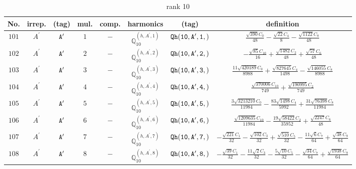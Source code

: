 \documentclass[fleqn,8pt]{jsarticle}
\begin{document}
\begin{table}[ht!]
\begin{center}
\caption{rank 10}
\renewcommand{\arraystretch}{1.3}
\begin{tabular}{cccccccc} \hline \hline
No. & irrep. & (tag) & mul. & comp. & harmonics & (tag) & definition \\ \hline
$ 101 $ & $ A^{\prime} $ & $ {\tt A'} $ & $ 1 $ & $ - $ & $ \mathbb{Q}_{10}^{(h,A^{\prime},1)} $ & $ {\tt Qh(10,A',1,)} $ & $ \frac{\sqrt{390} C_{0}}{48} - \frac{\sqrt{22} C_{4}}{8} - \frac{\sqrt{1122} C_{8}}{48} $ \\
$ 102 $ & $ A^{\prime} $ & $ {\tt A'} $ & $ 2 $ & $ - $ & $ \mathbb{Q}_{10}^{(h,A^{\prime},2)} $ & $ {\tt Qh(10,A',2,)} $ & $ - \frac{\sqrt{85} C_{10}}{16} + \frac{\sqrt{1482} C_{2}}{48} + \frac{\sqrt{57} C_{6}}{48} $ \\
$ 103 $ & $ A^{\prime} $ & $ {\tt A'} $ & $ 3 $ & $ - $ & $ \mathbb{Q}_{10}^{(h,A^{\prime},3)} $ & $ {\tt Qh(10,A',3,)} $ & $ \frac{11 \sqrt{420189} C_{0}}{8988} + \frac{\sqrt{827645} C_{4}}{1498} - \frac{\sqrt{146055} C_{8}}{8988} $ \\
$ 104 $ & $ A^{\prime} $ & $ {\tt A'} $ & $ 4 $ & $ - $ & $ \mathbb{Q}_{10}^{(h,A^{\prime},4)} $ & $ {\tt Qh(10,A',4,)} $ & $ \frac{\sqrt{370006} C_{10}}{749} + \frac{\sqrt{190995} C_{2}}{749} $ \\
$ 105 $ & $ A^{\prime} $ & $ {\tt A'} $ & $ 5 $ & $ - $ & $ \mathbb{Q}_{10}^{(h,A^{\prime},5)} $ & $ {\tt Qh(10,A',5,)} $ & $ \frac{3 \sqrt{3213210} C_{0}}{11984} - \frac{83 \sqrt{1498} C_{4}}{5992} + \frac{31 \sqrt{76398} C_{8}}{11984} $ \\
$ 106 $ & $ A^{\prime} $ & $ {\tt A'} $ & $ 6 $ & $ - $ & $ \mathbb{Q}_{10}^{(h,A^{\prime},6)} $ & $ {\tt Qh(10,A',6,)} $ & $ \frac{\sqrt{1209635} C_{10}}{11984} - \frac{19 \sqrt{58422} C_{2}}{35952} + \frac{\sqrt{2247} C_{6}}{48} $ \\
$ 107 $ & $ A^{\prime} $ & $ {\tt A'} $ & $ 7 $ & $ - $ & $ \mathbb{Q}_{10}^{(h,A^{\prime},7)} $ & $ {\tt Qh(10,A',7,)} $ & $ - \frac{\sqrt{221} C_{1}}{32} - \frac{\sqrt{102} C_{3}}{32} + \frac{\sqrt{510} C_{5}}{32} - \frac{11 \sqrt{6} C_{7}}{64} + \frac{\sqrt{38} C_{9}}{64} $ \\
$ 108 $ & $ A^{\prime} $ & $ {\tt A'} $ & $ 8 $ & $ - $ & $ \mathbb{Q}_{10}^{(h,A^{\prime},8)} $ & $ {\tt Qh(10,A',8,)} $ & $ - \frac{\sqrt{39} C_{1}}{32} - \frac{11 \sqrt{2} C_{3}}{32} - \frac{5 \sqrt{10} C_{5}}{32} - \frac{\sqrt{34} C_{7}}{64} + \frac{\sqrt{1938} C_{9}}{64} $ \\

\end{tabular}
\end{center}
\end{table}
\end{document}
